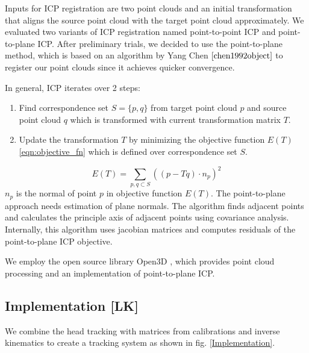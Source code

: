 Inputs for ICP registration are two point clouds and an initial transformation that aligns the source point cloud with the target point cloud approximately. We evaluated two variants of ICP registration named point-to-point ICP and point-to-plane ICP. 
After preliminary trials, we decided to use the point-to-plane method, which is based on an algorithm by Yang Chen $\cite{chen1992object}$ to register our point clouds since it achieves quicker convergence.

In general, ICP iterates over 2 steps:
\begin{enumerate}[leftmargin=*]
    \item Find correspondence set $S=\{p,q\}$ from target point cloud $p$ and source point cloud $q$ which is transformed with current transformation matrix $T$.
    \item Update the transformation $T$ by minimizing the objective function $E(T)$ \eqref{eqn:objective_fn} which is defined over correspondence set $S$.
\end{enumerate}
\begin{equation}
E(T)=\sum_{p,q\subset{S}}{((p-Tq)\cdot n_p)^2}
\label{eqn:objective_fn}
\end{equation}
$n_p$ is the normal of point $p$ \cite{rusinkiewicz2001efficient} in objective function $E(T)$. The point-to-plane approach needs estimation of plane normals. The algorithm finds  adjacent points and calculates the principle axis of adjacent points using covariance analysis. Internally, this algorithm uses jacobian matrices and computes residuals of the point-to-plane ICP objective.

We employ the open source library Open3D \cite{Open3D}, which provides point cloud processing and an implementation of point-to-plane ICP.
 

\subsection{Implementation [LK]}
We combine the head tracking with matrices from calibrations and inverse kinematics to create a tracking system as shown in fig. \ref{Implementation}.

